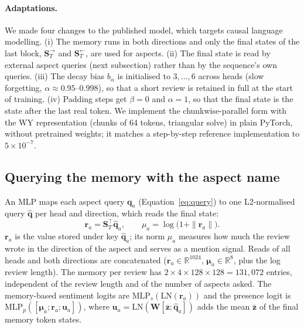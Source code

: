 \documentclass[11pt]{article}
\begin{document}
\paragraph{Adaptations.} We made four changes to the published model, which targets causal language
modelling. (i) The memory runs in both directions and only the final states of the last block,
$\mathbf{S}^{\rightarrow}_T$ and $\mathbf{S}^{\leftarrow}_T$, are used for aspects. (ii) The final state
is read by external aspect queries (next subsection) rather than by the sequence's own queries. (iii)
The decay bias $b_\alpha$ is initialised to $3,\dots,6$ across heads (slow forgetting, $\alpha\approx
0.95$--$0.998$), so that a short review is retained in full at the start of training. (iv) Padding
steps get $\beta=0$ and $\alpha=1$, so that the final state is the state after the last real token. We
implement the chunkwise-parallel form with the WY representation (chunks of 64 tokens, triangular
solve) in plain PyTorch, without pretrained weights; it matches a step-by-step reference
implementation to $5\times10^{-7}$.

\subsection{Querying the memory with the aspect name}
An MLP maps each aspect query $\mathbf{q}_a$ (Equation~\ref{eq:query}) to one L2-normalised query
$\hat{\mathbf{q}}$ per head and direction, which reads the final state:
\begin{equation}
\mathbf{r}_a = \mathbf{S}_T^\top\hat{\mathbf{q}}_a ,\qquad \mu_a = \log\big(1+\|\mathbf{r}_a\|\big).
\label{eq:read}
\end{equation}
$\mathbf{r}_a$ is the value stored under key $\hat{\mathbf{q}}_a$; its norm $\mu_a$ measures how much
the review wrote in the direction of the aspect and serves as a mention signal. Reads of all heads and
both directions are concatenated ($\mathbf{r}_a\in\mathbb{R}^{1024}$, $\bm{\mu}_a\in\mathbb{R}^{8}$,
plus the log review length). The memory per review has $2\times4\times128\times128=131{,}072$ entries,
independent of the review length and of the number of aspects asked. The memory-based sentiment
logits are $\mathrm{MLP}_s(\mathrm{LN}(\mathbf{r}_a))$ and the presence logit is
$\mathrm{MLP}_p([\bm{\mu}_a;\mathbf{r}_a;\mathbf{u}_a])$, where
$\mathbf{u}_a=\mathrm{LN}(\mathbf{W}[\bar{\mathbf{z}};\hat{\mathbf{q}}_a])$ adds the mean
$\bar{\mathbf{z}}$ of the final memory token states.
\end{document}
